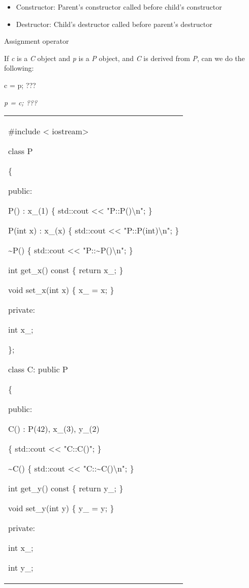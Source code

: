 \documentclass[
]{article}
\providecommand{\tightlist}{%
  \setlength{\itemsep}{0pt}\setlength{\parskip}{0pt}}
\begin{document}
\begin{itemize}
\tightlist
\item
  Constructor: Parent's constructor called before child's constructor
\item
  Destructor: Child's destructor called before parent's destructor
\end{itemize}

Assignment operator

If \emph{c} is a \emph{C} object and \emph{p} is a \emph{P} object, and
\emph{C} is derived from \emph{P}, can we do the following:

c = p; ???

\emph{p = c; ???}\\

\begin{longtable}[]{@{}
  >{\raggedright\arraybackslash}p{}@{}}
\toprule\noalign{}
 \\
\midrule\noalign{}
\endhead
\bottomrule\noalign{}
\endlastfoot
\#include < iostream\textgreater{}

class P

\{

public:

P() : x\_(1) \{ std::cout <<{} "P::P()\textbackslash n";
\}

P(int x) : x\_(x) \{ std::cout <<{}
"P::P(int)\textbackslash n"; \}

\textasciitilde P() \{ std::cout <<{}
"P::\textasciitilde P()\textbackslash n"; \}

int get\_x() const \{ return x\_; \}

void set\_x(int x) \{ x\_ = x; \}

private:

int x\_;

\};

class C: public P

\{

public:

C() : P(42), x\_(3), y\_(2)

\{ std::cout <<{} "C::C()"; \}

\textasciitilde C() \{ std::cout <<{}
"C::\textasciitilde C()\textbackslash n"; \}

int get\_y() const \{ return y\_; \}

void set\_y(int y) \{ y\_ = y; \}

private:

int x\_;

int y\_;


\end{longtable}
\end{document}

